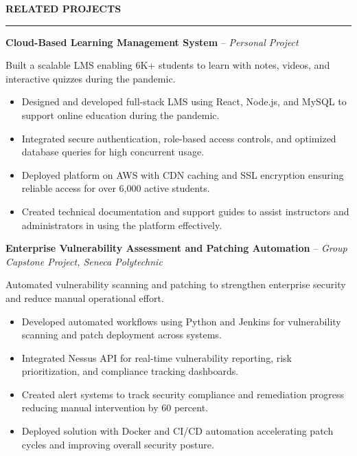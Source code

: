 \documentclass[10pt,letterpaper]{article}
\begin{document}
\vspace{6pt}

\textbf{RELATED PROJECTS}\\[-8pt]
\noindent\rule{\textwidth}{1pt}

\vspace{-2pt}

\textbf{Cloud-Based Learning Management System} -- \emph{Personal Project}

\vspace{-1pt}

Built a scalable LMS enabling 6K+ students to learn with notes, videos, and interactive quizzes during the pandemic.
\vspace{-1pt}
\begin{itemize}
\item Designed and developed full-stack LMS using React, Node.js, and MySQL to support online education during the pandemic.
\item Integrated secure authentication, role-based access controls, and optimized database queries for high concurrent usage.
\item Deployed platform on AWS with CDN caching and SSL encryption ensuring reliable access for over 6,000 active students.
\item Created technical documentation and support guides to assist instructors and administrators in using the platform effectively.
\end{itemize}

\textbf{Enterprise Vulnerability Assessment and Patching Automation} -- \emph{Group Capstone Project, Seneca Polytechnic }

\vspace{-1pt}

Automated vulnerability scanning and patching to strengthen enterprise security and reduce manual operational effort.
\vspace{-1pt}
\begin{itemize}
\item Developed automated workflows using Python and Jenkins for vulnerability scanning and patch deployment across systems.
\item Integrated Nessus API for real-time vulnerability reporting, risk prioritization, and compliance tracking dashboards.
\item Created alert systems to track security compliance and remediation progress reducing manual intervention by 60 percent.
\item Deployed solution with Docker and CI/CD automation accelerating patch cycles and improving overall security posture.
\end{itemize}
\end{document}
